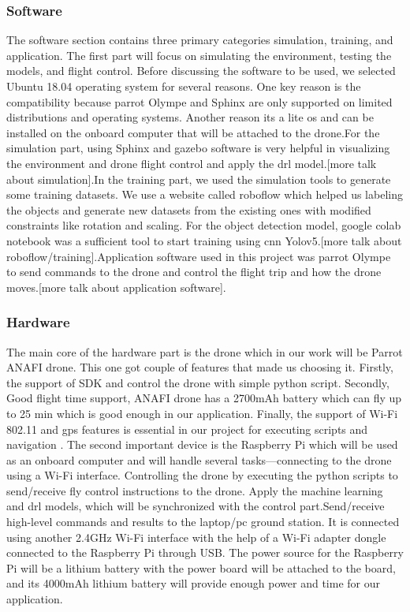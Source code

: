 \documentclass[../main.tex]{subfiles}
\begin{document}
\subsubsection{Software}
The software section contains three primary categories simulation, training, and application. The first part will focus on simulating the environment, testing the models, and flight control. Before discussing the software to be used, we selected Ubuntu 18.04 operating system for several reasons. One key reason is the compatibility because parrot Olympe and Sphinx are only supported on limited distributions and operating systems. Another reason its a lite os and can be installed on the onboard computer that will be attached to the drone.For the simulation part, using Sphinx and gazebo software is very helpful in visualizing the environment and drone flight control and apply the \gls{drl} model.[more talk about simulation].In the training part, we used the simulation tools to generate some training datasets. We use a website called roboflow which helped us labeling the objects and generate new datasets from the existing ones with modified constraints like rotation and scaling. For the object detection model, google colab notebook was a sufficient tool to start training using \gls{cnn} Yolov5.[more talk about roboflow/training].Application software used in this project was parrot Olympe to send commands to the drone and control the flight trip and how the drone moves.[more talk about application software].


\subsubsection{Hardware}
The main core of the hardware part is the drone which in our work will be Parrot ANAFI drone. This one got couple of features that made us choosing it. Firstly, the support of SDK and control the drone with simple python script. Secondly, Good flight time support, ANAFI drone has a 2700mAh battery which can fly up to 25 min which is good enough in our application. Finally, the support of Wi-Fi 802.11 and \gls{gps} features is essential in our project for executing scripts and navigation . The second important device is the Raspberry Pi which will be used as an onboard computer and will handle several tasks—connecting to the drone using a Wi-Fi interface. Controlling the drone by executing the python scripts to send/receive fly control instructions to the drone. Apply the machine learning and \gls{drl} models, which will be synchronized with the control part.Send/receive high-level commands and results to the laptop/pc ground station. It is connected using another 2.4GHz Wi-Fi interface with the help of a Wi-Fi adapter dongle connected to the Raspberry Pi through USB. The power source for the Raspberry Pi will be a lithium battery with the power board will be attached to the board, and its 4000mAh lithium battery will provide enough power and time for our application.      
\end{document}
